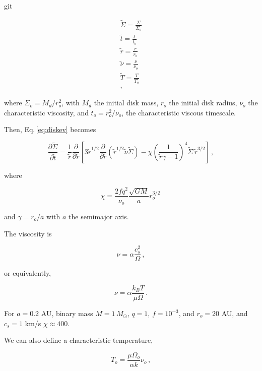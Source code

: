git\documentclass{article}
\begin{document}
\begin{align} 
\tilde{\Sigma} = \frac{\Sigma}{\Sigma_o}\\
\tilde{t} = \frac{t}{t_o}\\
\tilde{r} = \frac{r}{r_o}\\
\tilde{\nu} = \frac{\nu}{\nu_o}\\
\tilde{T} = \frac{T}{T_o}\\,
\end{align}

where $\Sigma_o = M_d/r_o^2$, with $M_d$ the initial disk mass, $r_o$ the initial disk radius, $\nu_o$ the characteristic viscosity, and $t_o = r_o^2/\nu_o$, the characteristic viscous timescale.

Then, Eq.\,\ref{eq:diskev} becomes

\begin{equation}
\frac{\partial \tilde{\Sigma}}{\partial \tilde{t}} = \frac{1}{\tilde{r}} \frac{\partial}{\partial \tilde{r}} \left[3 \tilde{r}^{1/2} \frac{\partial}{\partial \tilde{r}}  \left(\tilde{r}^{1/2} \tilde{\nu}\tilde{\Sigma} \right) - \chi\left(\frac{1}{\tilde{r}\gamma -1} \right)^4\tilde{\Sigma}\,\tilde{r}^{3/2}\right]\,,
\end{equation}

where

\begin{equation}
\chi = \frac{2 f q^2}{\nu_o} \frac{\sqrt{G M}}{a} r_o^{3/2}\,
\end{equation}

 and $\gamma = r_o/a$ with $a$ the semimajor axis. 
 
 The viscosity is 
 
 \begin{equation}
\nu = \alpha \frac{c_s^2}{\Omega}\,,
\end{equation}

or equivalently,

\begin{equation}
\nu = 	\alpha \frac{k_B T}{\mu \Omega}\,.
\end{equation}

For $a = 0.2$ AU, binary mass $M = 1\,M_{\odot}$, $q=1$, $f = 10^{-3}$, and $r_o = 20$ AU, and $c_s = 1$ km/s $\chi \approx 400$.

We can also define a characteristic temperature,

\begin{equation}
T_o = \frac{\mu \Omega_o}{\alpha k} \nu_o\,,
\end{equation}
\end{document}
